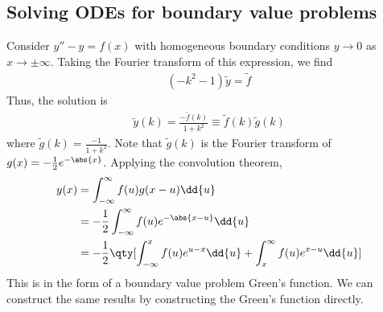 \subsection{Solving ODEs for boundary value problems}
Consider $y'' - y = f(x)$ with homogeneous boundary conditions $y \to 0$ as $x \to \pm \infty$.
Taking the Fourier transform of this expression, we find
\begin{align*}
	(-k^2 - 1) \widetilde y = \widetilde f
\end{align*}
Thus, the solution is
\begin{align*}
	\widetilde y(k) = \frac{-\widetilde f(k)}{1+k^2} \equiv \widetilde f(k) \widetilde g(k)
\end{align*}
where $\widetilde g(k) = \frac{-1}{1 + k^2}$.
Note that $\widetilde g(k)$ is the Fourier transform of $g(x) = -\frac{1}{2} e^{-\abs{x}}$.
Applying the convolution theorem,
\begin{align*}
	y(x) & = \int_{-\infty}^\infty f(u) g(x-u) \dd{u}                                                    \\
	     & = -\frac{1}{2} \int_{-\infty}^\infty f(u) e^{-\abs{x-u}}\dd{u}                                \\
	     & = -\frac{1}{2} \qty[ \int_{-\infty}^x f(u) e^{u-x}\dd{u} + \int_x^\infty f(u) e^{x-u}\dd{u} ]
\end{align*}
This is in the form of a boundary value problem Green's function.
We can construct the same results by constructing the Green's function directly.

